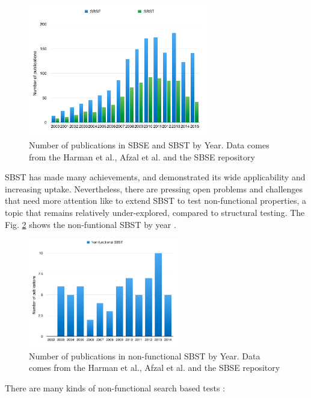 \documentclass{report}
\begin{document}
\begin{figure}[h]
\centering
\includegraphics[width=0.7\textwidth]{./images/publications1.png}
\caption{Number of publications in SBSE and SBST by Year. Data comes from the Harman et al., Afzal et al. and the SBSE repository  \cite{Afzal2009a} \cite{Harman2015}}
\label{fig:sbsesbst}
\end{figure}

SBST has made many achievements, and demonstrated its wide applicability and increasing uptake. Nevertheless, there are pressing open problems and challenges that need more attention like to extend SBST to test non-functional properties, a topic that remains relatively under-explored, compared to structural testing. The Fig. \ref{fig:nonfunctional} shows the non-funtional SBST by year \cite{Aleti2016} \cite{Harman2015}.


\begin{figure}[h]
\centering
\includegraphics[width=0.6\textwidth]{./images/nonfunctional.png}
\caption{Number of publications in non-functional SBST by Year. Data comes from the Harman et al., Afzal et al. and the SBSE repository  \cite{Afzal2009a} \cite{Harman2015} }
\label{fig:nonfunctional}
\end{figure}



There are many kinds of non-functional search based tests  \cite{Afzal2009a}:
\end{document}
